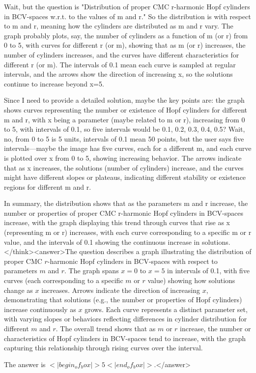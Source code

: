Wait, but the question is "Distribution of proper CMC r-harmonic Hopf cylinders in BCV-spaces w.r.t. to the values of m and r." So the distribution is with respect to m and r, meaning how the cylinders are distributed as m and r vary. The graph probably plots, say, the number of cylinders as a function of m (or r) from 0 to 5, with curves for different r (or m), showing that as m (or r) increases, the number of cylinders increases, and the curves have different characteristics for different r (or m). The intervals of 0.1 mean each curve is sampled at regular intervals, and the arrows show the direction of increasing x, so the solutions continue to increase beyond x=5. 

Since I need to provide a detailed solution, maybe the key points are: the graph shows curves representing the number or existence of Hopf cylinders for different m and r, with x being a parameter (maybe related to m or r), increasing from 0 to 5, with intervals of 0.1, so five intervals would be 0.1, 0.2, 0.3, 0.4, 0.5? Wait, no, from 0 to 5 is 5 units, intervals of 0.1 mean 50 points, but the user says five intervals—maybe the image has five curves, each for a different m, and each curve is plotted over x from 0 to 5, showing increasing behavior. The arrows indicate that as x increases, the solutions (number of cylinders) increase, and the curves might have different slopes or plateaus, indicating different stability or existence regions for different m and r. 

In summary, the distribution shows that as the parameters m and r increase, the number or properties of proper CMC r-harmonic Hopf cylinders in BCV-spaces increase, with the graph displaying this trend through curves that rise as x (representing m or r) increases, with each curve corresponding to a specific m or r value, and the intervals of 0.1 showing the continuous increase in solutions.</think><answer>The question describes a graph illustrating the distribution of proper CMC \( r \)-harmonic Hopf cylinders in BCV-spaces with respect to parameters \( m \) and \( r \). The graph spans \( x = 0 \) to \( x = 5 \) in intervals of 0.1, with five curves (each corresponding to a specific \( m \) or \( r \) value) showing how solutions change as \( x \) increases. Arrows indicate the direction of increasing \( x \), demonstrating that solutions (e.g., the number or properties of Hopf cylinders) increase continuously as \( x \) grows. Each curve represents a distinct parameter set, with varying slopes or behaviors reflecting differences in cylinder distribution for different \( m \) and \( r \). The overall trend shows that as \( m \) or \( r \) increase, the number or characteristics of Hopf cylinders in BCV-spaces tend to increase, with the graph capturing this relationship through rising curves over the interval.  

The answer is \(<|begin_of_box|>5<|end_of_box|>\).</answer>
